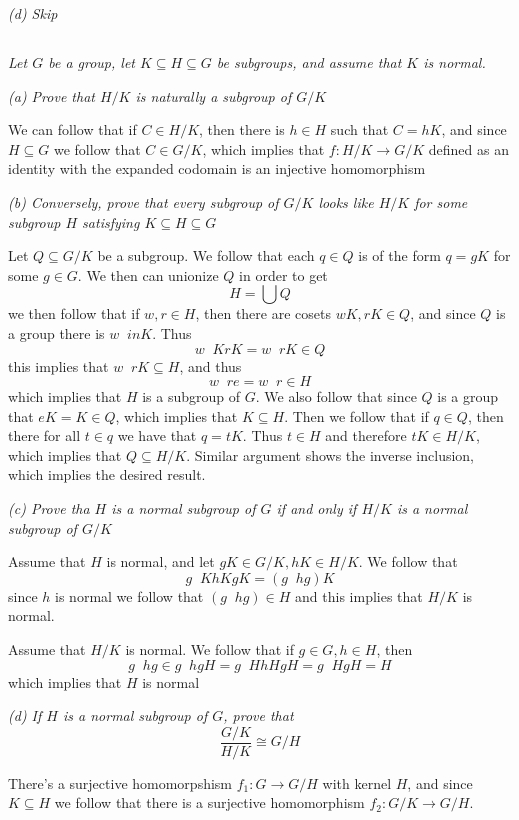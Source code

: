 \documentclass[11pt,oneside,titlepage]{book}
\DeclareMathOperator \inv {^{-1}}
\begin{document}
\textit{(d) Skip}

\subsection{}

\textit{Let $G$ be a group, let $K \subseteq H \subseteq G$ be
  subgroups, and assume that $K$ is normal.}

\textit{(a) Prove that $H/K$ is naturally a subgroup of $G/K$}

We can follow that if $C \in H/K$, then there is $h \in H$ such that
$C = hK$, and since $H \subseteq G$ we follow that $C \in G/K$, which
implies that $f: H/K \to G/K$ defined as an identity with the expanded
codomain is an injective homomorphism

\textit{(b) Conversely, prove that every subgroup of $G/K$ looks like
  $H/K$ for some subgroup $H$ satisfying $K \subseteq H \subseteq G$}

Let $Q \subseteq G/K$ be a subgroup. We follow that each $q \in Q$ is
of the form $q = gK$ for some $g \in G$.  We then can unionize $Q$ in
order to get
$$H = \bigcup Q$$
we then follow that if $w, r \in H$, then there are cosets $wK, rK \in
Q$, and since $Q$ is a group there is $w\inv in K$.  Thus
$$w\inv K r K = w\inv r K \in Q$$
this implies that $w\inv r K \subseteq H$, and thus
$$w\inv r e = w\inv r \in H$$
which implies that $H$ is a subgroup of $G$. We also follow that since
$Q$ is a group that $eK = K \in Q$, which implies that $K \subseteq
H$. Then we follow that if $q \in Q$, then there for all $t \in q$ we
have that $q = tK$. Thus $t \in H$ and therefore $tK \in H/K$, which
implies that $Q \subseteq H/K$. Similar argument shows the inverse
inclusion, which implies the desired result.

\textit{(c) Prove tha $H$ is a normal subgroup of $G$ if and only if
  $H/K$ is a normal subgroup of $G/K$}

Assume that $H$ is normal, and let $gK \in G/K, hK \in H/K$. We follow that
$$g\inv K h K g K = (g\inv h g) K$$
since $h$ is normal we follow that $(g\inv h g) \in H$ and this implies that
$H/K$ is normal.

Assume that $H/K$ is normal. We follow that if $g \in G, h \in H$, then
$$g\inv h g \in g\inv h g H = g\inv H h H g H = g\inv H g H = H$$
which implies that $H$ is normal

\textit{(d) If $H$ is a normal subgroup of $G$, prove that
  $$\frac{G/K}{H/K} \cong G/H$$}

There's a surjective homomorpshism $f_1: G \to G/H$ with kernel $H$, and
since $K \subseteq H$ we follow that there is a surjective
homomorphism $f_2: G/K \to G/H$.
\end{document}
